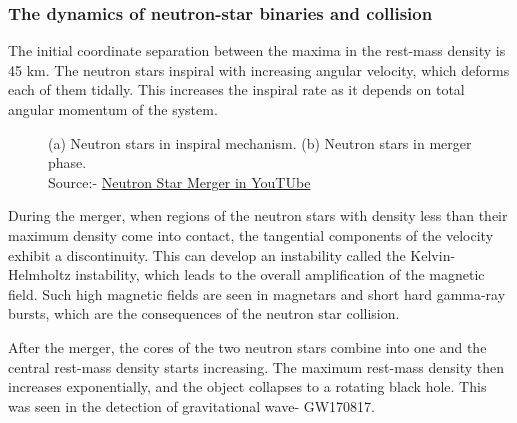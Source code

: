 \subsubsection{The dynamics of neutron-star binaries and collision}

The initial coordinate separation between the maxima in the rest-mass density is 45 km. The neutron stars inspiral with increasing angular velocity, which deforms each of them tidally. This increases the inspiral rate as it depends on total angular momentum of the system. 

\begin{figure}[h]
    \centering
    \qquad
    \caption{(a) Neutron stars in inspiral mechanism. (b) Neutron stars in merger phase.\\ Source:- \href{https://youtu.be/y8VDwGi0r0E}{Neutron Star Merger in YouTUbe}}
\end{figure}

\noindent
During the merger, when regions of the neutron stars with density less than their maximum density come into contact, the tangential components of the velocity exhibit a discontinuity. This can develop an instability called the Kelvin-Helmholtz instability, which leads to the overall amplification of the magnetic field. Such high magnetic fields are seen in magnetars and short hard gamma-ray bursts, which are the consequences of the neutron star collision.

After the merger, the cores of the two neutron stars combine into one and the central rest-mass density starts increasing. The maximum rest-mass density then increases exponentially, and the object collapses to a rotating black hole. This was seen in the detection of gravitational wave- GW170817.

